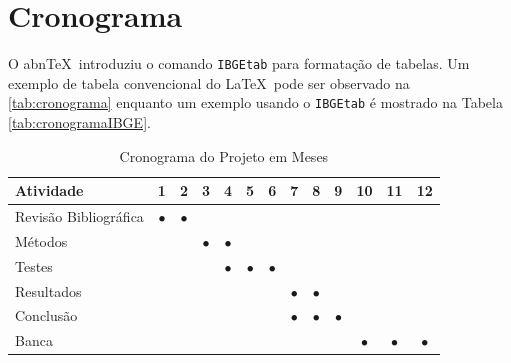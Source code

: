 \documentclass[
	12pt,				    %
	openright,			    %
	oneside,			    %
	a4paper,			    %
    sumario=tradicional,    %
	english,			    %
	brazil,				    %
	]{abntex2}              %
\begin{document}
\chapter{Cronograma}\label{sec:cronograma}
O abn\TeX\ introduziu o comando \texttt{IBGEtab} para formatação de tabelas. Um exemplo de tabela convencional do \LaTeX\ pode ser observado na \autoref{tab:cronograma} enquanto um exemplo usando o \texttt{IBGEtab} é mostrado na Tabela \ref{tab:cronogramaIBGE}.

\begin{table}[htbp]
  \centering
    \caption[Cronograma Normal]{Cronograma do Projeto em Meses}
    \label{tab:cronograma}
    \begin{tabular}{lcccccccccccc} %
    \toprule
    \textbf{Atividade} & \textbf{1} & \textbf{2} & \textbf{3} & \textbf{4} & \textbf{5} & \textbf{6} & \textbf{7} & \textbf{8} & \textbf{9} & \textbf{10} & \textbf{11} & \textbf{12} \\
    \midrule
        Revisão Bibliográfica & $\bullet$ & $\bullet$ & & & & & & & & & & \\
        Métodos & & & $\bullet$ & $\bullet$ & & & & & & & & \\
        Testes & & & & $\bullet$ & $\bullet$ & $\bullet$ & & & & & & \\
        Resultados & & & & & & & $\bullet$ & $\bullet$ & & & & \\
        Conclusão & & & & & & & $\bullet$ & $\bullet$ & $\bullet$ & & & \\
        Banca & & & & & & &&&& $\bullet$ & $\bullet$ & $\bullet$ \\
    \bottomrule
    \end{tabular}%
\end{table}%
\end{document}
